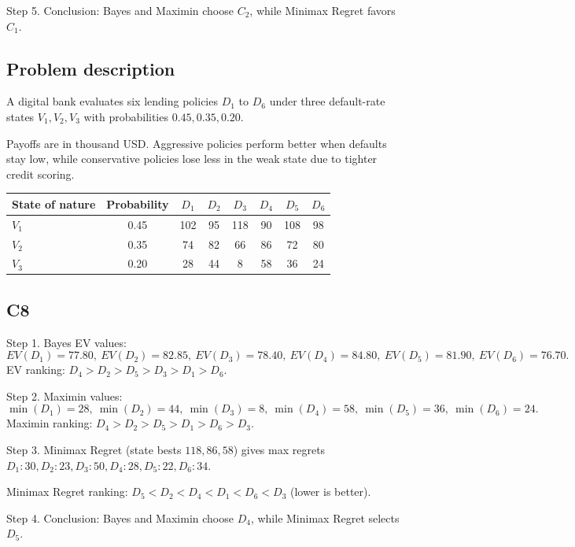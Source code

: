 \begin{ExamProblems}
		Step 5. Conclusion: Bayes and Maximin choose $C_2$, while Minimax Regret favors $C_1$.

		\newpage
		\item\leavevmode\par
		\subsection*{Problem description}
		A digital bank evaluates six lending policies $D_1$ to $D_6$ under three default-rate states $V_1,V_2,V_3$ with probabilities $0.45,0.35,0.20$.

		Payoffs are in thousand USD. Aggressive policies perform better when defaults stay low, while conservative policies lose less in the weak state due to tighter credit scoring.
		\begin{center}
			\begin{tabular}{l c c c c c c c}
				\toprule
				State of nature & Probability & $D_1$ & $D_2$ & $D_3$ & $D_4$ & $D_5$ & $D_6$ \\
				\midrule
				$V_1$ & 0.45 & 102 & 95 & 118 & 90 & 108 & 98 \\
				$V_2$ & 0.35 & 74 & 82 & 66 & 86 & 72 & 80 \\
				$V_3$ & 0.20 & 28 & 44 & 8 & 58 & 36 & 24 \\
				\bottomrule
			\end{tabular}
		\end{center}

		\subsection*{C8}
		Step 1. Bayes EV values:
		\[
		EV(D_1)=77.80,\ EV(D_2)=82.85,\ EV(D_3)=78.40,\ EV(D_4)=84.80,\ EV(D_5)=81.90,\ EV(D_6)=76.70.
		\]
		EV ranking: $D_4>D_2>D_5>D_3>D_1>D_6$.

		Step 2. Maximin values:
		\[
		\min(D_1)=28,\ \min(D_2)=44,\ \min(D_3)=8,\ \min(D_4)=58,\ \min(D_5)=36,\ \min(D_6)=24.
		\]
		Maximin ranking: $D_4>D_2>D_5>D_1>D_6>D_3$.

		Step 3. Minimax Regret (state bests $118,86,58$) gives max regrets $D_1:30, D_2:23, D_3:50, D_4:28, D_5:22, D_6:34$.

		Minimax Regret ranking: $D_5<D_2<D_4<D_1<D_6<D_3$ (lower is better).

		Step 4. Conclusion: Bayes and Maximin choose $D_4$, while Minimax Regret selects $D_5$.
	\end{ExamProblems}

